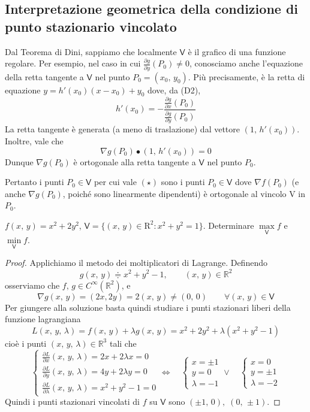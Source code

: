 \subsection{Interpretazione geometrica della condizione di punto stazionario vincolato}
Dal Teorema di Dini, sappiamo che localmente $\mathsf{V}$ è il grafico di una funzione regolare. Per esempio, nel caso in cui $\frac{\partial g}{\partial y} (P_0) \neq 0$, conosciamo anche l'equazione della retta tangente a $\mathsf{V}$ nel punto $P_0 = (x_0,\,y_0)$. Più precisamente, è la retta di equazione $y = h'(x_0)(x-x_0) + y_0$ dove, da (D2),
$$
h'(x_0) = - \frac{\displaystyle \frac{\partial g}{\partial x} (P_0)}{\displaystyle \frac{\partial g}{\partial y} (P_0)}
$$
La retta tangente è generata (a meno di traslazione) dal vettore $\left( 1,\,h'(x_0) \right)$. Inoltre, vale che
$$
\nabla g(P_0) \bullet \left( 1,\,h'(x_0) \right) = 0
$$
Dunque $\nabla g (P_0)$ è ortogonale alla retta tangente a $\mathsf{V}$ nel punto $P_0$.
\begin{center}
\def\svgwidth{6cm}

\end{center}
Pertanto i punti $P_0 \in \mathsf{V}$ per cui vale $(\star)$ sono i punti $P_0 \in \mathsf{V}$ dove $\nabla f (P_0)$ (e anche $\nabla g (P_0)$, poiché sono linearmente dipendenti) è ortogonale al vincolo $\mathrm{V}$ in $P_0$.

\begin{example}
$f(x,\,y) = x^2 + 2y^2$, $\mathsf{V} = \lbrace (x,\,y) \in \mathrm{R}^2 : x^2 + y^2 = 1 \rbrace$.
Determinare $\underset{\mathsf{V}}{\max} f$ e $\underset{\mathsf{V}}{\min} f$.
\end{example}
\begin{proof}
Applichiamo il metodo dei moltiplicatori di Lagrange. Definendo
$$
g(x,\,y) \doteqdot x^2 + y^2 -1, \qquad (x,\,y) \in \mathbb{R}^2
$$
osserviamo che $f,\,g \in C^{\infty}(\mathbb{R}^2)$, e
$$
\nabla g(x,\,y) = (2x, 2y) = 2(x,\,y) \neq (0,\,0) \qquad \forall (x,\,y) \in \mathsf{V}
$$
Per giungere alla soluzione basta quindi studiare i punti stazionari liberi della funzione lagrangiana
$$
L(x,\,y,\,\lambda) = f(x,\,y) + \lambda g(x,\,y) = x^2 + 2y^2 + \lambda ( x^2 + y^2 -1)
$$
cioè i punti $(x,\,y,\,\lambda) \in \mathbb{R}^3$ tali che
$$
\begin{cases}
\frac{\partial L}{\partial x} (x,\,y,\,\lambda) = 2x + 2\lambda x = 0\\
\frac{\partial L}{\partial y} (x,\,y,\,\lambda) = 4y + 2\lambda y = 0\\
\frac{\partial L}{\partial \lambda} (x,\,y,\,\lambda) = x^2 + y^2 - 1 = 0
\end{cases}
\Longleftrightarrow \quad
\begin{cases}
x = \pm 1\\
y = 0\\
\lambda = -1
\end{cases}
\vee \quad 
\begin{cases}
x = 0\\
y = \pm 1\\
\lambda = -2
\end{cases}
$$
Quindi i punti stazionari vincolati di $f$ su $\mathsf{V}$ sono $(\pm 1,\,0),\;(0,\,\pm 1)$.
\end{proof}

